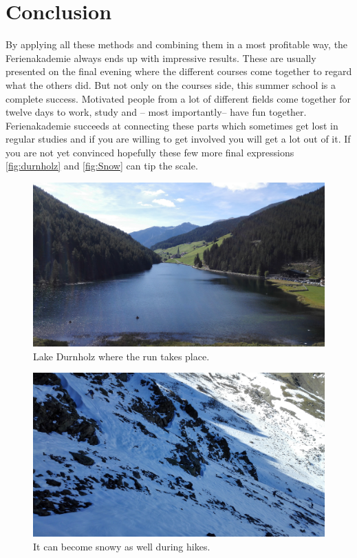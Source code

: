 \section{Conclusion}
By applying all these methods and combining them in a most profitable way, the Ferienakademie always ends up with impressive results. These are usually presented on the final evening where the different courses come together to regard what the others did. But not only on the courses side, this summer school is a complete success. Motivated people from a lot of different fields come together for twelve days to work, study and -- most importantly-- have fun together. Ferienakademie succeeds at connecting these parts which sometimes get lost in regular studies and if you are willing to get involved you will get a lot out of it. If you are not yet convinced hopefully these few more final expressions \autoref{fig:durnholz} and \autoref{fig:Snow} can tip the scale.
\begin{figure}[ht]%
 	\begin{center}%
 		\includegraphics[scale=0.045]{img/Durnholz.jpg}%
 		\caption{Lake Durnholz where the run takes place.}\label{fig:durnholz}%
 	\end{center}%
\end{figure}
\begin{figure}[ht]%
 	\begin{center}%
 		\includegraphics[scale=0.045]{img/Snow.jpg}%
 		\caption{It can become snowy as well during hikes.}\label{fig:Snow}%
 	\end{center}%
\end{figure}